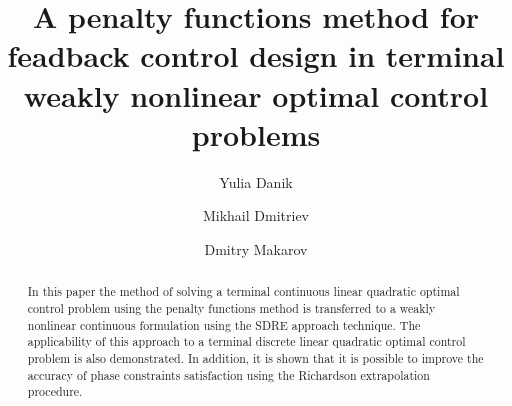 \documentclass[12pt]{llncs}
\begin{document}
\fi

\title{A penalty functions method for feadback control design in terminal weakly nonlinear optimal control problems}

\author{Yulia Danik \and Mikhail Dmitriev \and Dmitry Makarov
}

\maketitle

\begin{abstract}

In this paper the method of solving a terminal continuous linear quadratic optimal control problem using the penalty functions method is transferred to a weakly nonlinear continuous formulation using the SDRE approach technique. The applicability of this approach to a terminal discrete linear quadratic optimal control problem is also demonstrated. In addition, it is shown that it is possible to improve the accuracy of phase constraints satisfaction using the Richardson extrapolation procedure.

\end{abstract}
\end{document}
